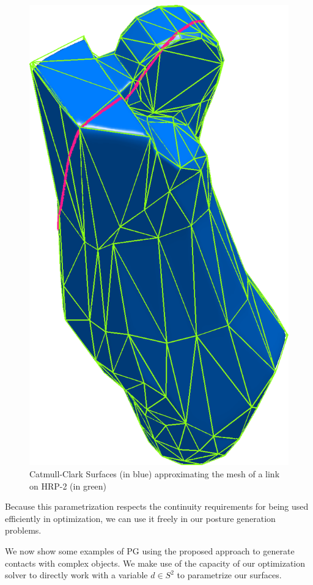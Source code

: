 \begin{figure}
    \includegraphics[width = 0.2\paperwidth]{leg3smoothSharp.png}
\caption{Catmull-Clark Surfaces (in blue) approximating the mesh of a link on HRP-2 (in green)}
\label{fig:CCS}
\end{figure}

Because this parametrization respects the continuity requirements for being used efficiently in optimization, we can use it freely in our posture generation problems.

We now show some examples of PG using the proposed approach to generate contacts with complex objects.
We make use of the capacity of our optimization solver to directly work with a variable $d\in S^2$ to parametrize our surfaces.

